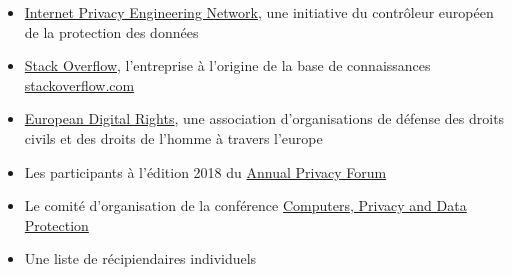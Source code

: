 \documentclass{scrlttr2}
\let\tightlist\relax
\begin{document}
\begin{letter}{}
\begin{itemize}
\tightlist
\item
  \href{https://edps.europa.eu/data-protection/ipen-internet-privacy-engineering-network_en}{Internet
  Privacy Engineering Network}, une initiative du contrôleur européen de
  la protection des données
\item
  \href{https://stackoverflow.com/company}{Stack Overflow}, l'entreprise
  à l'origine de la base de connaissances
  \href{http://stackoverflow.com/}{stackoverflow.com}
\item
  \href{https://edri.org/}{European Digital Rights}, une association
  d'organisations de défense des droits civils et des droits de l'homme
  à travers l'europe
\item
  Les participants à l'édition 2018 du
  \href{http://privacyforum.eu/}{Annual Privacy Forum}
\item
  Le comité d'organisation de la conférence
  \href{http://www.cpdpconferences.org/}{Computers, Privacy and Data
  Protection}
\item
  Une liste de récipiendaires individuels
\end{itemize}

\end{letter}
\end{document}
